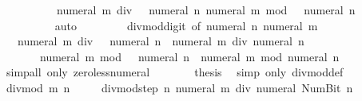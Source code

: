 \begin{isabellebody}
\ \ \ \ \ \ \ \ {\isacharparenleft}{\kern0pt}{}\ {\isacharasterisk}{\kern0pt}\ {\isacharparenleft}{\kern0pt}numeral\ m\ div\ {\isacharparenleft}{\kern0pt}{}\ {\isacharasterisk}{\kern0pt}\ numeral\ n{\isacharparenright}{\kern0pt}{\isacharparenright}{\kern0pt}{\isacharcomma}{\kern0pt}\ numeral\ m\ mod\ {\isacharparenleft}{\kern0pt}{}\ {\isacharasterisk}{\kern0pt}\ numeral\ n{\isacharparenright}{\kern0pt}{\isacharparenright}{\kern0pt}{\isachardoublequoteclose}\isanewline
\ \ \ \ \ \ \ \ \isamarkupfalse%
\ auto\isanewline
\ \ \ \ \isamarkupfalse%
\ \isamarkupfalse%
\ {\isacharasterisk}{\kern0pt}\ divmod{\isacharunderscore}{\kern0pt}digit{\isacharunderscore}{\kern0pt}{}\ {\isacharbrackleft}{\kern0pt}of\ {\isachardoublequoteopen}numeral\ n{\isachardoublequoteclose}\ {\isachardoublequoteopen}numeral\ m{\isachardoublequoteclose}{\isacharbrackright}{\kern0pt}\isanewline
\ \ \ \ \ \ \isamarkupfalse%
\ {\isachardoublequoteopen}{}\ {\isacharasterisk}{\kern0pt}\ {\isacharparenleft}{\kern0pt}numeral\ m\ div\ {\isacharparenleft}{\kern0pt}{}\ {\isacharasterisk}{\kern0pt}\ numeral\ n{\isacharparenright}{\kern0pt}{\isacharparenright}{\kern0pt}\ {\isacharequal}{\kern0pt}\ numeral\ m\ div\ numeral\ n{\isachardoublequoteclose}\isanewline
\ \ \ \ \ \ \ {\isachardoublequoteopen}numeral\ m\ mod\ {\isacharparenleft}{\kern0pt}{}\ {\isacharasterisk}{\kern0pt}\ numeral\ n{\isacharparenright}{\kern0pt}\ {\isacharequal}{\kern0pt}\ numeral\ m\ mod\ numeral\ n{\isachardoublequoteclose}\isanewline
\ \ \ \ \ \ \isamarkupfalse%
\ {\isacharparenleft}{\kern0pt}simp{\isacharunderscore}{\kern0pt}all\ only{\isacharcolon}{\kern0pt}\ zero{\isacharunderscore}{\kern0pt}less{\isacharunderscore}{\kern0pt}numeral{\isacharparenright}{\kern0pt}\isanewline
\ \ \ \ \isamarkupfalse%
\ \isamarkupfalse%
\ {\isacharquery}{\kern0pt}thesis\ \isamarkupfalse%
\ {\isacharparenleft}{\kern0pt}simp\ only{\isacharcolon}{\kern0pt}\ divmod{\isacharunderscore}{\kern0pt}def{\isacharparenright}{\kern0pt}\isanewline
\ \ \isamarkupfalse%
\isanewline
\ \ \isamarkupfalse%
\ \isamarkupfalse%
\ {\isachardoublequoteopen}divmod\ m\ n\ {\isacharequal}{\kern0pt}\isanewline
\ \ \ \ divmod{\isacharunderscore}{\kern0pt}step\ n\ {\isacharparenleft}{\kern0pt}numeral\ m\ div\ numeral\ {\isacharparenleft}{\kern0pt}Num{\isachardot}{\kern0pt}Bit{}\ n{\isacharparenright}{\kern0pt}{\isacharcomma}{\kern0pt}\isanewline

\end{isabellebody}
